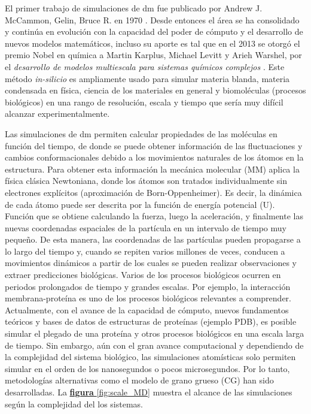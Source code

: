 El primer trabajo de simulaciones de \ac{dm} fue publicado por Andrew J. McCammon, Gelin, Bruce R. en 1970 \citep{McCammon1977}. Desde entonces el área se ha consolidado y continúa en evolución con la capacidad del poder de cómputo y el desarrollo de nuevos modelos matemáticos, incluso su aporte es tal que en el 2013 se otorgó el premio Nobel en química a Martin Karplus, Michael Levitt y Arieh Warshel, por el \textit{desarrollo de modelos multiescala para sistemas químicos complejos} \citep{Zhou2014}.
Este método \textit{in-silicio} es ampliamente usado para simular materia blanda, materia condensada en física, ciencia de los materiales en general y biomoléculas (procesos biológicos) en una rango de resolución, escala y tiempo que sería muy difícil alcanzar experimentalmente.

Las simulaciones de \ac{dm} permiten calcular propiedades de las moléculas en función del tiempo, de donde se puede obtener información de las fluctuaciones y cambios conformacionales debido a los movimientos naturales de los átomos en la estructura. Para obtener esta información la mecánica molecular (MM) aplica la física clásica Newtoniana, donde los átomos son tratados individualmente sin electrones explícitos (aproximación de Born-Oppenheimer). Es decir, la dinámica de cada átomo puede ser descrita por la función de energía potencial (U). Función que se obtiene calculando la fuerza, luego la aceleración, y finalmente las nuevas coordenadas espaciales de la partícula en un intervalo de tiempo muy pequeño. De esta manera, las coordenadas de las partículas pueden propagarse a lo largo del tiempo y, cuando se repiten varios millones de veces, conducen a movimientos dinámicos a partir de los cuales se pueden realizar observaciones y extraer predicciones biológicas. Varios de los procesos biológicos ocurren en periodos prolongados de tiempo y grandes escalas. Por ejemplo, la interacción membrana-proteína es uno de los procesos biológicos relevantes a comprender. Actualmente, con el avance de la capacidad de cómputo, nuevos fundamentos teóricos y bases de datos de estructuras de proteínas (ejemplo PDB), es posible simular el plegado de una proteína y otros procesos biológicos en una escala larga de tiempo. Sin embargo, aún con el gran avance computacional y dependiendo de la complejidad del sistema biológico, las simulaciones atomísticas solo permiten simular en el orden de los nanosegundos o pocos microsegundos. Por lo tanto, metodologías alternativas como el modelo de grano grueso (CG) han sido desarrolladas. La \hyperref[fig:scale_MD]{\textbf{figura} \ref*{fig:scale_MD}} muestra el alcance de las simulaciones según la complejidad del los sistemas.

